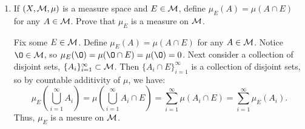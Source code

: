 \begin{enumerate}
\item If $(X, {\mathcal M}, \mu)$ is a measure space and $E \in {\mathcal M}$, define $\mu_E(A)=\mu(A\cap E)$ for any $A \in {\mathcal M}$. Prove that $\mu_E$ is a measure on ${\mathcal M}$.

\begin{pf}
	Fix some $E \in {\mathcal M}$. Define $\mu_E(A)=\mu(A\cap E)$ for any $A \in {\mathcal M}$. Notice $\O \in \M$, so $\mu_E(\O)=\mu(\O \cap E)= \mu(\O)=0$. Next consider a collection of disjoint sets, $\{A_i\}_{i=1}^\infty \subset {\mathcal M}$. Then $\{A_i \cap E\}_{i=1}^\infty$ is a collection of disjoint sets, so by countable additivity of $\mu$, we have:
	\[
	\mu_E\left( \bigcup_{i = 1}^\infty A_i\right)=\mu\left( \bigcup_{i = 1}^\infty A_i \cap E\right)= \sum_{i=1}^\infty \mu(A_i \cap E) = \sum_{i=1}^\infty \mu_E(A_i).
	\] 
	Thus, $\mu_E$ is a mesure on ${\mathcal M}$. 
\end{pf}


\end{enumerate}
